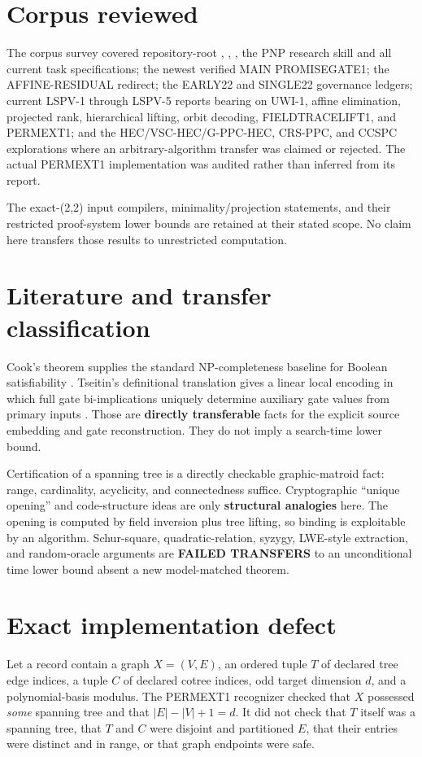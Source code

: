 \documentclass[11pt]{article}
\begin{document}
\section{Corpus reviewed}
The corpus survey covered repository-root , ,
, the PNP research skill and all current task specifications;
the newest verified MAIN PROMISEGATE1; the AFFINE-RESIDUAL redirect; the
EARLY22 and SINGLE22 governance ledgers; current LSPV-1 through LSPV-5 reports
bearing on UWI-1, affine elimination, projected rank, hierarchical lifting,
orbit decoding, FIELDTRACELIFT1, and PERMEXT1; and the HEC/VSC-HEC/G-PPC-HEC,
CRS-PPC, and CCSPC explorations where an arbitrary-algorithm transfer was
claimed or rejected.  The actual PERMEXT1 implementation
 was
audited rather than inferred from its report.

The exact-(2,2) input compilers, minimality/projection statements, and their
restricted proof-system lower bounds are retained at their stated scope.  No
claim here transfers those results to unrestricted computation.

\section{Literature and transfer classification}
Cook's theorem supplies the standard NP-completeness baseline for Boolean
satisfiability \cite{Cook}.  Tseitin's definitional translation gives a linear
local encoding in which full gate bi-implications uniquely determine auxiliary
gate values from primary inputs \cite{Tseitin}.  Those are \textbf{directly
transferable} facts for the explicit source embedding and gate reconstruction.
They do not imply a search-time lower bound.

Certification of a spanning tree is a directly checkable graphic-matroid fact:
range, cardinality, acyclicity, and connectedness suffice.  Cryptographic
``unique opening'' and code-structure ideas are only \textbf{structural
analogies} here.  The opening is computed by field inversion plus tree lifting,
so binding is exploitable by an algorithm.  Schur-square, quadratic-relation,
syzygy, LWE-style extraction, and random-oracle arguments are
\textbf{FAILED TRANSFERS} to an unconditional time lower bound absent a new
model-matched theorem.

\section{Exact implementation defect}
Let a record contain a graph $X=(V,E)$, an ordered tuple $T$ of declared tree
edge indices, a tuple $C$ of declared cotree indices, odd target dimension
$d$, and a polynomial-basis modulus.  The PERMEXT1 recognizer checked that
$X$ possessed \emph{some} spanning tree and that $|E|-|V|+1=d$.  It did not
check that $T$ itself was a spanning tree, that $T$ and $C$ were disjoint and
partitioned $E$, that their entries were distinct and in range, or that graph
endpoints were safe.
\end{document}
